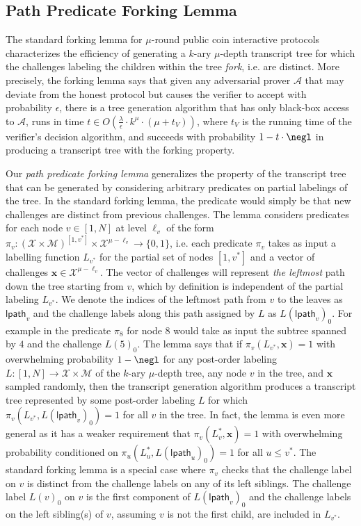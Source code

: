 \subsection{Path Predicate Forking Lemma}
The standard forking lemma for $\mu$-round public coin interactive protocols characterizes the efficiency of generating a $k$-ary $\mu$-depth transcript tree for which the challenges labeling the children within the tree \emph{fork}, i.e. are distinct. More precisely, the forking lemma says that given any adversarial prover $\mathcal{A}$ that may deviate from the honest protocol but causes the verifier to accept with probability $\epsilon$, there is a tree generation algorithm that has only black-box access to $\mathcal{A}$, runs in time $t \in O(\frac{\lambda}{\epsilon} \cdot k^\mu \cdot (\mu + t_V))$, where $t_V$ is the running time of the verifier's decision algorithm, and succeeds with probability $1 - t \cdot \negl$ in producing a transcript tree with the forking property. 

 Our \emph{path predicate forking lemma} generalizes the property of the transcript tree that can be generated by considering arbitrary predicates on partial labelings of the tree. In the standard forking lemma, the predicate would simply be that new challenges are distinct from previous challenges. The lemma considers predicates for each node $v \in [1,N]$ at level $\ell_v$ of the form $\pi_v: (\mathcal{X}\times \mathcal{M})^{[1,v^*]} \times \mathcal{X}^{\mu - \ell_v} \rightarrow \{0,1\}$, i.e. each predicate $\pi_v$ takes as input a labelling function $L_{v^*}$ for the partial set of nodes $[1,v^*]$ and a vector of challenges $\mathbf{x} \in \mathcal{X}^{\mu - \ell_v}$. 
 The vector of challenges will represent \emph{the leftmost} path down the tree starting from $v$, which by definition is independent of the partial labeling $L_{v^*}$. We denote the indices of the leftmost path from $v$ to the leaves as $\textsf{lpath}_v$ and the challenge labels along this path assigned by $L$ as $L(\textsf{lpath}_v)_0$. For example in  the predicate $\pi_8$ for node $8$ would take as input the subtree spanned by $4$ and the challenge $L(5)_0$. The lemma says that if $\pi_v(L_{v^*}, \mathbf{x}) = 1$ with overwhelming probability $1 - \negl$ for any post-order labeling $L:[1,N] \rightarrow \mathcal{X} \times \mathcal{M}$ of the $k$-ary $\mu$-depth tree, any node $v$ in the tree, and $\mathbf{x}$ sampled randomly, then the transcript generation algorithm produces a transcript tree represented by some post-order labeling $L$ for which $\pi_v(L_{v^*}, L(\textsf{lpath}_v)_0) = 1$ for all $v$ in the tree. In fact, the lemma is even more general as it has a weaker requirement that $\pi_v(L_v^*, \mathbf{x}) = 1$ with overwhelming probability conditioned on $\pi_u(L_u^*, L(\textsf{lpath}_u)_0) = 1$ for all $u \leq v^*$. The standard forking lemma is a special case where $\pi_v$ checks that the challenge label on $v$ is distinct from the challenge labels on any of its left siblings. The challenge label $L(v)_0$ on $v$ is the first component of $L(\textsf{lpath}_v)_0$ and the challenge labels on the left sibling(s) of $v$, assuming $v$ is not the first child, are included in $L_{v^*}$. 
 
